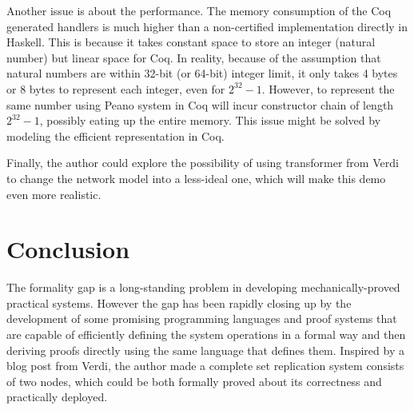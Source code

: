 \documentclass[twocolumn]{article}
\begin{document}
Another issue is about the performance. The memory consumption of the Coq
generated handlers is much higher than a non-certified implementation directly
in Haskell. This is because it takes constant space to store an integer
(natural number) but linear space for Coq. In reality, because of the
assumption that natural numbers are within 32-bit (or 64-bit) integer limit, it
only takes 4 bytes or 8 bytes to represent each integer, even for $2^32-1$.
However, to represent the same number using Peano system in Coq will incur
constructor chain of length $2^32-1$, possibly eating up the entire memory.
This issue might be solved by modeling the efficient representation in Coq.

Finally, the author could explore the possibility of using transformer from
Verdi to change the network model into a less-ideal one, which will make this
demo even more realistic.
\section{Conclusion}
The formality gap is a long-standing problem in developing mechanically-proved
practical systems. However the gap has been rapidly closing up by the
development of some promising programming languages and proof systems that are
capable of efficiently defining the system operations in a formal way and then
deriving proofs directly using the same language that defines them. Inspired by a
blog post from Verdi, the author made a complete set replication system
consists of two nodes, which could be both formally proved about its
correctness and practically deployed.
{}

\end{document}
